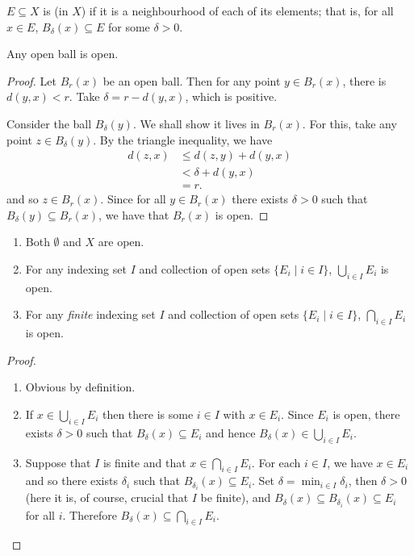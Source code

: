 \begin{definition}
$E\subseteq X$ is  (in $X$) if it is a neighbourhood of each of its elements; that is, for all $x\in E$, $B_\delta(x)\subseteq E$ for some $\delta>0$.
\end{definition}

\begin{proposition}
Any open ball is open.
\end{proposition}

\begin{proof}
Let $B_r(x)$ be an open ball. Then for any point $y\in B_r(x)$, there is $d(y,x)<r$. Take $\delta=r-d(y,x)$, which is positive.

Consider the ball $B_\delta(y)$. We shall show it lives in $B_r(x)$. For this, take any point $z\in B_\delta(y)$. By the triangle inequality, we have
\begin{align*}
d(z,x)&\le d(z,y)+d(y,x)\\
&<\delta+d(y,x)\\
&=r.
\end{align*}
and so $z\in B_r(x)$. Since for all $y\in B_r(x)$ there exists $\delta>0$ such that $B_\delta(y)\subseteq B_r(x)$, we have that $B_r(x)$ is open.
\end{proof}

\begin{proposition}\label{prop:open-set-properties}
\begin{enumerate}[label=(\roman*)]
\item Both $\emptyset$ and $X$ are open.
\item For any indexing set $I$ and collection of open sets $\{E_i\mid i\in I\}$, $\bigcup_{i\in I}E_i$ is open.
\item For any \emph{finite} indexing set $I$ and collection of open sets $\{E_i\mid i\in I\}$, $\bigcap_{i\in I}E_i$ is open.
\end{enumerate}
\end{proposition}

\begin{proof} \
\begin{enumerate}[label=(\roman*)]
\item Obvious by definition.
\item If $ x\in\bigcup_{i\in I}E_i$ then there is some $i\in I$ with $x\in E_i$. Since $E_i$ is open, there exists $\delta>0$ such that $B_\delta(x)\subseteq E_i$ and hence $ B_\delta(x)\in\bigcup_{i\in I}E_i$.
\item Suppose that $I$ is finite and that $ x\in\bigcap_{i\in I}E_i$. For each $i\in I$, we have $x\in E_i$ and so there exists $\delta_i$ such that $B_{\delta_i}(x)\subseteq E_i$. Set $\delta=\min_{i\in I}\delta_i$, then $\delta>0$ (here it is, of course, crucial that $I$ be finite), and $B_\delta(x)\subseteq B_{\delta_i}(x)\subseteq E_i$ for all $i$. Therefore $ B_\delta(x)\subseteq\bigcap_{i\in I}E_i$.
\end{enumerate}
\end{proof}

